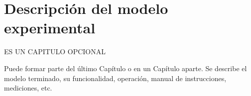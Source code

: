\chapter{Descripción del modelo experimental}

ES UN CAPITULO OPCIONAL

Puede formar parte del último Capítulo o en un Capítulo aparte. 
Se describe el modelo terminado, su funcionalidad, operación, manual de instrucciones, mediciones, etc.
